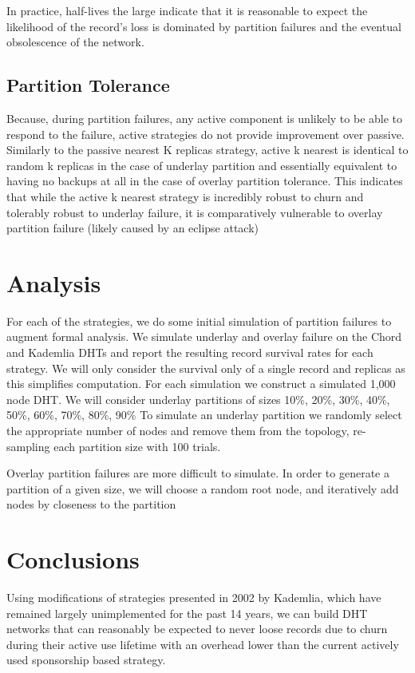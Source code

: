 \documentclass[conference]{IEEEtran}
\begin{document}
In practice, half-lives the large indicate that it is reasonable to expect the likelihood of the record's loss is dominated by partition failures and the eventual obsolescence of the network.

\subsection{Partition Tolerance}
Because, during partition failures, any active component is unlikely to be able to respond to the failure, active strategies do not provide improvement over passive.
Similarly to the passive nearest K replicas strategy, active k nearest is identical to random k replicas in the case of underlay partition and essentially equivalent to having no backups at all in the case of overlay partition tolerance.
This indicates that while the active k nearest strategy is incredibly robust to churn and tolerably robust to underlay failure, it is comparatively vulnerable to overlay partition failure (likely caused by an eclipse attack)


\section{Analysis}

For each of the strategies, we do some initial simulation of partition failures to augment formal analysis.
We simulate underlay and overlay failure on the Chord and Kademlia DHTs and report the resulting record survival rates for each strategy.
We will only consider the survival only of a single record and replicas as this simplifies computation. 
For each simulation we construct a simulated 1,000 node DHT.
We will consider underlay partitions of sizes 10\%, 20\%, 30\%, 40\%, 50\%, 60\%, 70\%, 80\%, 90\%
To simulate an underlay partition we randomly select the appropriate number of nodes and remove them from the topology, re-sampling each partition size with 100 trials.

Overlay partition failures are more difficult to simulate.
In order to generate a partition of a given size, we will choose a random root node, and iteratively add nodes by closeness to the partition 



\section{Conclusions}

Using modifications of strategies presented in 2002 by Kademlia\cite{kademlia}, which have remained largely unimplemented for the past 14 years, we can build DHT networks that can reasonably be expected to never loose records due to churn during their active use lifetime with an overhead lower than the current actively used sponsorship based strategy.
\end{document}
